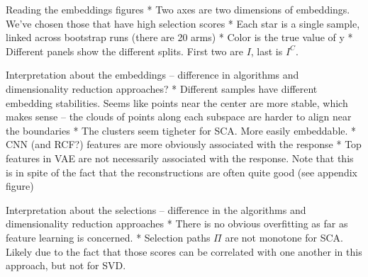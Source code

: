 Reading the embeddings figures
* Two axes are two dimensions of embeddings. We've chosen those that have high
selection scores
* Each star is a single sample, linked across bootstrap runs (there are 20 arms)
* Color is the true value of y
* Different panels show the different splits. First two are $I$, last is
$I^{C}$.

Interpretation about the embeddings -- difference in algorithms and
dimensionality reduction approaches?
* Different samples have different embedding stabilities. Seems like points near
the center are more stable, which makes sense -- the clouds of points along each
subspace are harder to align near the boundaries
* The clusters seem tigheter for SCA. More easily embeddable.
* CNN (and RCF?) features are more obviously associated with the response
* Top features in VAE are not necessarily associated with the response. Note
that this is in spite of the fact that the reconstructions are often quite good
(see appendix figure)

Interpretation about the selections -- difference in the algorithms and
dimensionality reduction approaches
* There is no obvious overfitting as far as feature learning is concerned.
* Selection paths $\Pi$ are not monotone for SCA. Likely due to the fact that
those scores can be correlated with one another in this approach, but not for
SVD.
